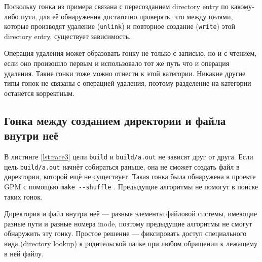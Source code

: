Поскольку гонка из примера связана с пересозданием directory entry по какому-либо пути, для её обнаружения достаточно проверять, что между целями, которые производят удаление (\texttt{unlink}) и повторное создание (\texttt{write}) этой directory entry, существует зависимость.

Операция удаления может образовать гонку не только с записью, но и с чтением, если оно произошло первым и использовало тот же путь что и операция удаления. Такие гонки тоже можно отнести к этой категории. Никакие другие типы гонок не связаны с операцией удаления, поэтому разделение на категории останется корректным.

\subsection{Гонка между созданием директории и файла внутри неё}
\label{subsec:dir-race}



В листинге \ref{lst:race3} цели \texttt{build} и \texttt{build/a.out} не зависят друг от друга. Если цель \texttt{build/a.out} начнёт собираться раньше, она не сможет создать файл в директории, которой ещё не существует. Такая гонка была обнаружена в проекте GPM с помощью \texttt{make {-}{-}shuffle} \cite{race-3-example}. Предыдущие алгоритмы не помогут в поиске таких гонок.

Директория и файл внутри неё --- разные элементы файловой системы, имеющие разные пути и разные номера inode, поэтому предыдущие алгоритмы не смогут обнаружить эту гонку. Простое решение --- фиксировать доступ специального вида (directory lookup) к родительской папке при любом обращении к лежащему в ней файлу.

